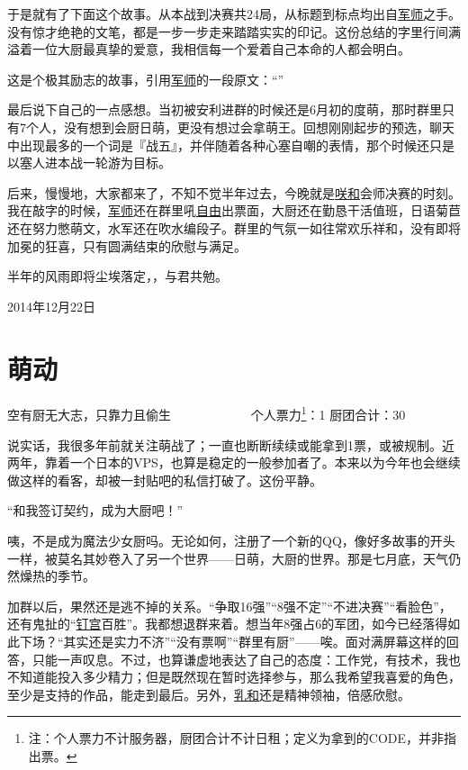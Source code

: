 于是就有了下面这个故事。从本战到决赛共24局，从标题到标点均出自\uline{军师}之手。没有惊才绝艳的文笔，都是一步一步走来踏踏实实的印记。这份总结的字里行间满溢着一位大厨最真挚的爱意，我相信每一个爱着自己本命的人都会明白。

这是个极其励志的故事，引用\uline{军师}的一段原文：“\SUETEXT ”

最后说下自己的一点感想。当初被安利进群的时候还是6月初的度萌，那时群里只有7个人，没有想到会厨日萌，更没有想过会拿萌王。回想刚刚起步的预选，聊天中出现最多的一个词是『战五』，并伴随着各种心塞自嘲的表情，那个时候还只是以塞人进本战一轮游为目标。

后来，慢慢地，大家都来了，不知不觉半年过去，今晚就是\uline{咲}\uline{和}会师决赛的时刻。我在敲字的时候，\uline{军师}还在群里吼\uline{自由}出票面，大厨还在勤恳干活值班，日语菊苣还在努力憋萌文，水军还在吹水编段子。群里的气氛一如往常欢乐祥和，没有即将加冕的狂喜，只有圆满结束的欣慰与满足。

半年的风雨即将尘埃落定，，与君共勉。

\begin{flushright}

2014年12月22日
\end{flushright}

\chapter{萌动}

\begin{center}
{\subTitle 空有厨无大志，只靠力且偷生}
\subMemo
　　　　　　个人票力\footnote{注：个人票力不计服务器，厨团合计不计日租；定义为拿到的CODE，并非指出票。}：1 厨团合计：30
\end{center}

说实话，我很多年前就关注萌战了；一直也断断续续或能拿到1票，或被规制。近两年，靠着一个日本的VPS，也算是稳定的一般参加者了。本来以为今年也会继续做这样的看客，却被一封贴吧的私信打破了。这份平静。

 “和我签订契约，成为大厨吧！”

咦，不是成为魔法少女厨吗。无论如何，注册了一个新的QQ，像好多故事的开头一样，被莫名其妙卷入了另一个世界——日萌，大厨的世界。那是七月底，天气仍然燥热的季节。

加群以后，果然还是逃不掉的关系。“争取16强”“8强不定”“不进决赛”“看脸色”，还有鬼扯的“\uline{钉宫}百胜”。我都想退群来着。想当年8强占6的军团，如今已经落得如此下场？“其实还是实力不济”“没有票啊”“群里有厨”——唉。面对满屏幕这样的回答，只能一声叹息。不过，也算谦虚地表达了自己的态度：工作党，有技术，我也不知道能投入多少精力；但是既然现在暂时选择参与，那么我希望我喜爱的角色，至少是支持的作品，能走到最后。另外，\uline{乳和}还是精神领袖，倍感欣慰。

